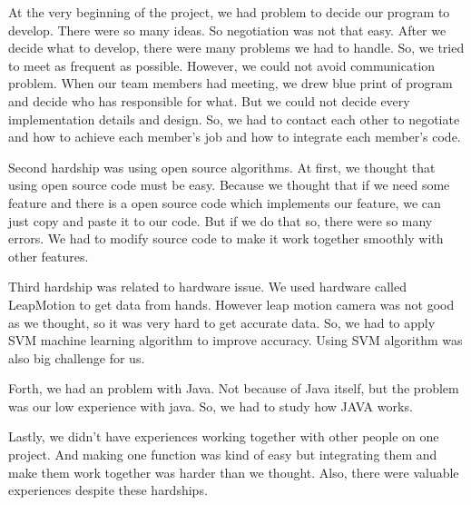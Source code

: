 \documentclass[10pt,journal,compsoc]{IEEEtran}
\begin{document}
At the very beginning of the project, we had problem to decide our program to develop. There were so many ideas. So negotiation was not that easy. After we decide what to develop, there were many problems we had to handle. So, we tried to meet as frequent as possible. However, we could not avoid communication problem. When our team members had meeting, we drew blue print of program and decide who has responsible for what. But we could not decide every implementation details and design. So, we had to contact each other to negotiate and how to achieve each member's job and how to integrate each member's code. 

Second hardship was using open source algorithms. At first, we thought that using open source code must be easy. Because we thought that if we need some feature and there is a open source code which implements our feature, we can just copy and paste it to our code. But if we do that so, there were so many errors. We had to modify source code to make it work together smoothly with other features.

Third hardship was related to hardware issue. We used hardware called LeapMotion to get data from hands. However leap motion camera was not good as we thought, so it was very hard to get accurate data. So, we had to apply SVM machine learning algorithm to improve accuracy. Using SVM algorithm was also big challenge for us.

Forth, we had an problem with Java. Not because of Java itself, but the problem was our low experience with java. So, we had to study how JAVA works.

Lastly, we didn’t have experiences working together with other people on one project. And making one function was kind of easy but integrating them and make them work together was harder than we thought.
Also, there were valuable experiences despite these hardships.
\end{document}
